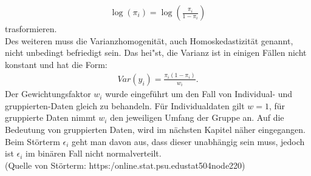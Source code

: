 \documentclass[12pt]{scrreprt}
\begin{document}
\begin{align}
\log(\pi_{i})=\log(\frac{\pi_{i}}{1-\pi_{i}})
\end{align}
trasformieren. \\
Des weiteren muss die Varianzhomogenität, auch Homoskedastizität genannt, nicht unbedingt befriedigt sein. Das hei"st, die Varianz ist in einigen Fällen nicht konstant und hat die Form:
\begin{align}
Var(y_{i})=\frac{\pi_{i}(1-\pi_{i})}{w_{i}}.
\end{align}
Der Gewichtungsfaktor $w_{i}$ wurde eingeführt um den Fall von Individual- und gruppierten-Daten gleich zu behandeln. Für Individualdaten gilt $w=1$, für gruppierte Daten nimmt $w_{i}$ den jeweiligen Umfang der Gruppe an. Auf die Bedeutung von gruppierten Daten, wird im nächsten Kapitel näher eingegangen. 
Beim Störterm $\epsilon_{i}$ geht man davon aus, dass dieser unabhängig sein muss, jedoch ist $\epsilon_{i}$ im binären Fall nicht normalverteilt. \\
(Quelle von Störterm: https:\//online.stat.psu.edu\/stat504\/node\/220\/)
\end{document}
